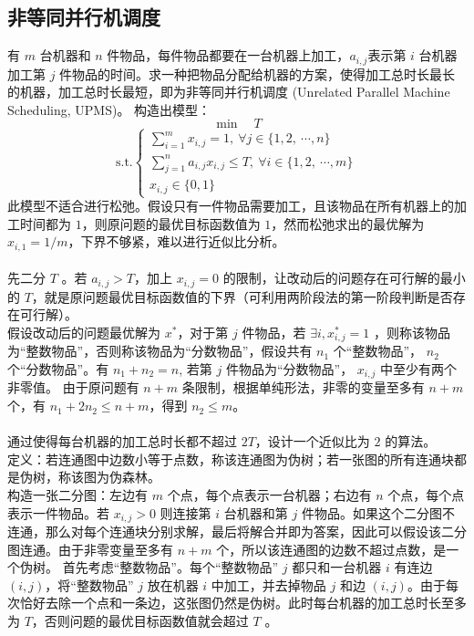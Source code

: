 \subsection{非等同并行机调度}
有 $m$ 台机器和 $n$ 件物品，每件物品都要在一台机器上加工，$a_{i, j}$表示第 $i$ 台机器加工第 $j$ 件物品的时间。求一种把物品分配给机器的方案，使得加工总时长最长的机器，加工总时长最短，即为非等同并行机调度 (Unrelated Parallel Machine Scheduling, UPMS)。
构造出模型：
$$
\min \quad T
$$
$$
\text{s.t.} 
\begin{cases}
    \sum_{i = 1}^m x_{i, j} = 1, \ \forall j \in \{1, 2, \ \cdots, n\} \\
    \sum_{j = 1}^n a_{i, j}x_{i, j} \le T, \ \forall i \in \{1, 2, \ \cdots, m\} \\
    x_{i, j} \in \{0, 1\}
\end{cases}
$$
此模型不适合进行松弛。假设只有一件物品需要加工，且该物品在所有机器上的加工时间都为 $1$，则原问题的最优目标函数值为 $1$，然而松弛求出的最优解为 $x_{i, 1} = 1/m$，下界不够紧，难以进行近似比分析。 \\~\\
先二分 $T$ 。若 $a_{i, j} > T$，加上 $x_{i, j} = 0$ 的限制，让改动后的问题存在可行解的最小的 $T$，就是原问题最优目标函数值的下界（可利用两阶段法的第一阶段判断是否存在可行解）。 \\
假设改动后的问题最优解为 $x^*$，对于第 $j$ 件物品，若 $\exists i, x^*_{i, j} = 1$ ，则称该物品为“整数物品”，否则称该物品为“分数物品”，假设共有 $n_1$ 个“整数物品”， $n_2$ 个“分数物品”。有 $n_1 + n_2 = n$, 若第 $j$ 件物品为“分数物品”， $x_{i, j}$ 中至少有两个非零值。
由于原问题有 $n + m$ 条限制，根据单纯形法，非零的变量至多有 $n + m$ 个，有 $n_1 + 2n_2 \le n + m$，得到 $n_2 \le m$。 \\~\\
通过使得每台机器的加工总时长都不超过 $2T$，设计一个近似比为 $2$ 的算法。 \\
定义：若连通图中边数小等于点数，称该连通图为伪树；若一张图的所有连通块都是伪树，称该图为伪森林。 \\
构造一张二分图：左边有 $m$ 个点，每个点表示一台机器；右边有 $n$ 个点，每个点表示一件物品。若 $x_{i, j} > 0$ 则连接第 $i$ 台机器和第 $j$ 件物品。如果这个二分图不连通，那么对每个连通块分别求解，最后将解合并即为答案，因此可以假设该二分图连通。由于非零变量至多有 $n+m$ 个，所以该连通图的边数不超过点数，是一个伪树。 
首先考虑“整数物品”。每个“整数物品” $j$ 都只和一台机器 $i$ 有连边 $(i, j)$，将“整数物品” $j$ 放在机器 $i$ 中加工，并去掉物品 $j$ 和边 $(i, j)$。由于每次恰好去除一个点和一条边，这张图仍然是伪树。此时每台机器的加工总时长至多为 $T$，否则问题的最优目标函数值就会超过 $T$ 。 \\
